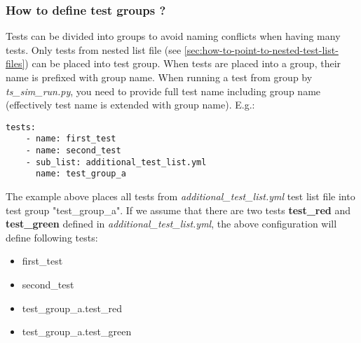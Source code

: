 \documentclass{tropic_design_spec}
\begin{document}


\subsubsection{How to define test groups ?}
\label{sec:how-to-define-test-groups}

Tests can be divided into groups to avoid naming conflicts when having many tests.
Only tests from nested list file (see \ref{sec:how-to-point-to-nested-test-list-files})
can be placed into test group. When tests are placed into a group, their name is
prefixed with group name. When running a test from group by \textit{ts_sim_run.py},
you need to provide full test name including group name (effectively test name is
extended with group name). E.g.:

\begin{lstlisting}
tests:
    - name: first_test
    - name: second_test
    - sub_list: additional_test_list.yml
      name: test_group_a
\end{lstlisting}

The example above places all tests from \textit{additional_test_list.yml} test list
file into test group "test_group_a". If we assume that there are two tests
\textbf{test_red} and \textbf{test_green} defined in \textit{additional_test_list.yml},
the above configuration will define following tests:

\begin{itemize}
    \item{first_test}
    \item{second_test}
    \item{test_group_a.test_red}
    \item{test_group_a.test_green}
\end{itemize}


\end{document}
